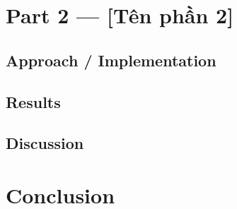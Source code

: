 \documentclass[12pt,a4paper]{article}
\begin{document}
\section{Part 2 --- [Tên phần 2]}

\subsection{Approach / Implementation}

\subsection{Results}

\subsection{Discussion}

\section{Conclusion}

\end{document}
